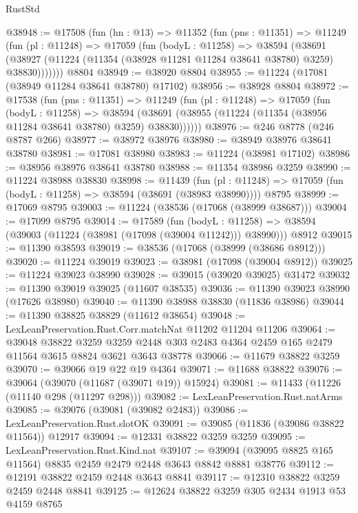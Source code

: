 \begin{lexlean}{RustStd}
\begin{coremodule}
@38948 := @17508
    (fun (hn : @13) =>
    @11352
      (fun (pns : @11351) =>
      @11249
        (fun (pl : @11248) =>
        @17059
          (fun (bodyL : @11258) =>
          @38594
            (@38691
              (@38927 (@11224 (@11354 (@38928 @11281 @11284 @38641 @38780) @3259) @38830)))))))
    @8804
@38949 := @38920 @8804
@38955 := @11224 (@17081 (@38949 @11284 @38641 @38780) @17102)
@38956 := @38928 @8804
@38972 := @17538
    (fun (pns : @11351) =>
    @11249
      (fun (pl : @11248) =>
      @17059
        (fun (bodyL : @11258) =>
        @38594 (@38691 (@38955 (@11224 (@11354 (@38956 @11284 @38641 @38780) @3259) @38830))))))
@38976 := @246 @8778 (@246 @8787 @266)
@38977 := @38972 @38976
@38980 := @38949 @38976 @38641 @38780
@38981 := @17081 @38980
@38983 := @11224 (@38981 @17102)
@38986 := @38956 @38976 @38641 @38780
@38988 := @11354 @38986 @3259
@38990 := @11224 @38988 @38830
@38998 := @11439
    (fun (pl : @11248) => @17059 (fun (bodyL : @11258) => @38594 (@38691 (@38983 @38990))))
    @8795
@38999 := @17069 @8795
@39003 := @11224 (@38536 (@17068 (@38999 @38687)))
@39004 := @17099 @8795
@39014 := @17589
    (fun (bodyL : @11258) => @38594 (@39003 (@11224 (@38981 (@17098 (@39004 @11242))) @38990)))
    @8912
@39015 := @11390 @38593
@39019 := @38536 (@17068 (@38999 (@38686 @8912)))
@39020 := @11224 @39019
@39023 := @38981 (@17098 (@39004 @8912))
@39025 := @11224 @39023 @38990
@39028 := @39015 (@39020 @39025) @31472
@39032 := @11390 @39019 @39025 (@11607 @38535)
@39036 := @11390 @39023 @38990 (@17626 @38980)
@39040 := @11390 @38988 @38830 (@11836 @38986)
@39044 := @11390 @38825 @38829 (@11612 @38654)
@39048 := LexLeanPreservation.Rust.Corr.matchNat @11202 @11204 @11206
@39064 := @39048
    @38822
    @3259
    @3259
    @2448
    @303
    @2483
    @4364
    @2459
    @165
    @2479
    @11564
    @3615
    @8824
    @3621
    @3643
    @38778
@39066 := @11679 @38822 @3259
@39070 := @39066 @19 @22 @19 @4364
@39071 := @11688 @38822
@39076 := @39064 (@39070 (@11687 (@39071 @19)) @15924)
@39081 := @11433 (@11226 (@11140 @298 (@11297 @298)))
@39082 := LexLeanPreservation.Rust.natArms
@39085 := @39076 (@39081 (@39082 @2483))
@39086 := LexLeanPreservation.Rust.slotOK
@39091 := @39085 (@11836 (@39086 @38822 @11564)) @12917
@39094 := @12331 @38822 @3259 @3259
@39095 := LexLeanPreservation.Rust.Kind.nat
@39107 := @39094 (@39095 @8825 @165 @11564) @8835 @2459 @2479 @2448 @3643 @8842 @8881 @38776
@39112 := @12191 @38822 @2459 @2448 @3643 @8841
@39117 := @12310 @38822 @3259 @2459 @2448 @8841
@39125 := @12624 @38822 @3259 @305 @2434 @1913 @53 @4159 @8765

\end{coremodule}
\end{lexlean}
